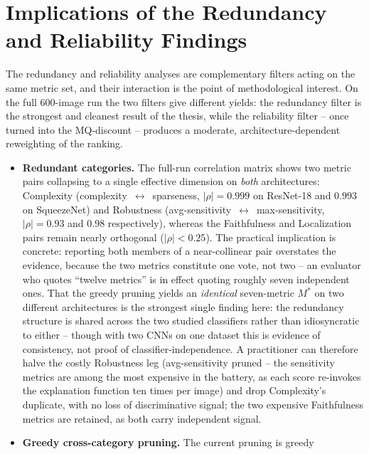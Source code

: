 \section{Implications of the Redundancy and Reliability Findings}
\label{sec:disc-redundancy}

The redundancy and reliability analyses are complementary filters acting on the
same metric set, and their interaction is the point of methodological interest.
On the full 600-image run the two filters give different yields: the
redundancy filter is the strongest and cleanest result of the thesis, while
the reliability filter -- once turned into the MQ-discount -- produces a
moderate, architecture-dependent reweighting of the ranking.

\begin{itemize}
    \item \textbf{Redundant categories.} The full-run correlation matrix shows
    two metric pairs collapsing to a single effective dimension on \emph{both}
    architectures: Complexity (complexity~$\leftrightarrow$~sparseness,
    $|\rho| = 0.999$ on ResNet-18 and $0.993$ on SqueezeNet) and Robustness
    (avg-sensitivity~$\leftrightarrow$~max-sensitivity, $|\rho| = 0.93$ and
    $0.98$ respectively), whereas the Faithfulness and Localization pairs remain
    nearly orthogonal ($|\rho| < 0.25$). The practical implication is concrete:
    reporting both members of a near-collinear pair overstates the evidence,
    because the two metrics constitute one vote, not two -- an evaluator who
    quotes ``twelve metrics'' is in effect quoting roughly seven independent
    ones. That the greedy pruning yields an \emph{identical} seven-metric
    $M^{*}$ on two different architectures is the strongest single finding here:
    the redundancy structure is shared across the two studied classifiers
    rather than idiosyncratic to either -- though with two CNNs on one
    dataset this is evidence of consistency, not proof of
    classifier-independence. A practitioner can therefore halve the costly
    Robustness
    leg (avg-sensitivity pruned -- the sensitivity metrics are among the most
    expensive in the battery, as each score re-invokes the explanation
    function ten times per image) and
    drop Complexity's duplicate, with no loss of discriminative signal; the two
    expensive Faithfulness metrics are retained, as both carry independent
    signal.
    \item \textbf{Greedy cross-category pruning.} The current pruning is greedy

\end{itemize}
